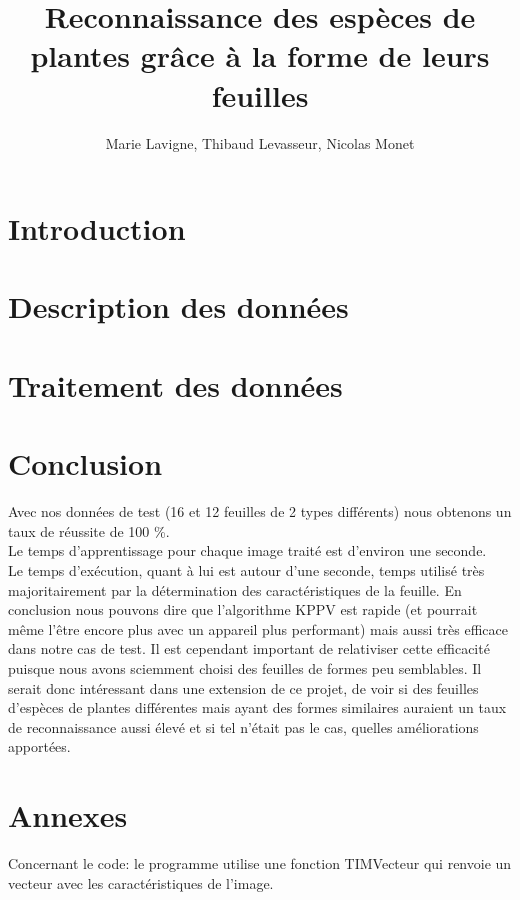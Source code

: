 \documentclass{article}
\title{Reconnaissance des espèces de plantes grâce à la forme de leurs feuilles}
\author{Marie Lavigne, Thibaud Levasseur, Nicolas Monet}
\begin{document}
\maketitle
\newpage
\tableofcontents
\newpage
\section{Introduction}

\newpage

\section{Description des données}

\section{Traitement des données}



\newpage
\section{Conclusion}
Avec nos données de test (16 et 12 feuilles de 2 types différents) nous obtenons un taux de réussite de 100 \%.\\
Le temps d'apprentissage pour chaque image traité est d'environ une seconde. \\
Le temps d'exécution, quant à lui est autour d'une seconde, temps utilisé très majoritairement par la détermination des caractéristiques de la feuille. 
En conclusion nous pouvons dire que l'algorithme KPPV est rapide (et pourrait même l'être encore plus avec un appareil plus performant) mais aussi très efficace dans notre cas de test.
Il est cependant important de relativiser cette efficacité puisque nous avons sciemment choisi des feuilles de formes peu semblables. Il serait donc intéressant dans une extension de ce projet, de voir si des feuilles d'espèces de plantes différentes mais ayant des formes similaires auraient un taux de reconnaissance aussi élevé et si tel n'était pas le cas, quelles améliorations apportées.
\newpage
\section{Annexes}
Concernant le code: le programme utilise une fonction TIMVecteur qui renvoie un vecteur avec les caractéristiques de l'image.
\end{document}
